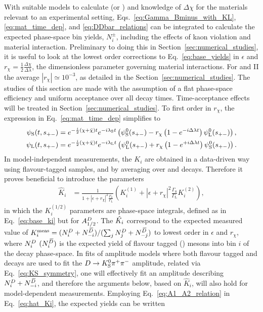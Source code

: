 With suitable models to calculate \ADorDbSL (or \ADorDbonetwo) and knowledge of $\Delta\chi$ for the materials relevant to an experimental setting, Eqs.~\eqref{eq:Gamma_Bminus_with_KL}, \eqref{eq:mat_time_dep}, and \eqref{eq:DDbar_relations} can be integrated to calculate the expected phase-space bin yields, $N^\pm_i$, including the effects of kaon \CP violation and material interaction. Preliminary to doing this in Section~\ref{sec:numerical_studies}, it is useful to look at the lowest order corrections to Eq.~\eqref{eq:base_yields} in $\epsilon$ and $r_\chi=\frac{1}{2}\frac{\Delta \chi}{\Delta \lambda}$, the dimensionless parameter governing material interactions. For \lhcb and \belle II the average $|r_\chi|\simeq10^{-3}$, as detailed in the Section~\ref{sec:numerical_studies}. The studies of this section are made with the assumption of a flat phase-space efficiency and uniform acceptance over all decay times. Time-acceptance effects will be treated in Section~\ref{sec:numerical_studies}. To first order in $r_\chi$, the expression in Eq.~\eqref{eq:mat_time_dep} simplifies to~\cite{Fetscher1996}
\begin{align}
\begin{split}
        \psi_\text{S}(t, s_{+-}) &= e^{-\frac{i}{2}(\chi + \bar \chi)t}e^{-i \lambda_{\rm S}t}\left( \psi^0_{\rm S}(s_{+-})
        -r_\chi\left(1-e^{-i\Delta\lambda t} \right)\psi^0_{\rm L}(s_{+-})\right), \\
    \psi_\text{L}(t, s_{+-}) &= e^{-\frac{i}{2}(\chi + \bar \chi)t}e^{-i \lambda_{\rm L}t}\left( \psi^0_{\rm L}(s_{+-})  
        +r_\chi\left(1-e^{+i\Delta\lambda t}\right)\psi^0_{\rm S}(s_{+-})\right).
\end{split}
\end{align}
 In model-independent measurements, the $K_i$ are obtained in a data-driven way using flavour-tagged \D samples, and by averaging over \Dz and \Dzb decays. Therefore it proves beneficial to introduce the parameters
\begin{align}\label{eq:hat_Ki}
\hat K_i &= \frac{1}{1+|\epsilon+r_\chi|^2\frac{\Gamma_\text{S}}{\Gamma_\text{L}}}\left(K_i^{(1)}+|\epsilon+r_\chi|^2\frac{\Gamma_\text{S}}{\Gamma_\text{L}}K_i^{(2)}\right),
\end{align}
in which the $K^{(1/2)}_i$ parameters are phase-space integrals, defined as in Eq.~\eqref{eq:base_ki} but for $A^{D}_{1/2}$. The $\hat {K_i}$ correspond to the expected measured value of $K_i^\text{meas}=({N^{D}_i + N^{\kern 0.18em\overline{\kern -0.18em D}}_{-i}})/({\sum_j N^{D}_j +N^{\kern 0.18em\overline{\kern -0.18em D}}_{-j}})$ to lowest order in $\epsilon$ and $r_\chi$, where $N^{D}_i$ $(N^{\kern 0.18em\overline{\kern -0.18em D}}_i)$ is the expected yield of flavour tagged \Dz (\Dzb) mesons into bin $i$ of the \D decay phase-space. In fits of amplitude models where both flavour tagged \Dz and \Dzb decays are used to fit the ${D}\rightarrow{\ensuremath{{K}^0_{\mathrm{S}}}}{\ensuremath{{\pi}^+}}{\ensuremath{{\pi}^-}}$ amplitude, related via Eq.~\eqref{eq:KS_symmetry}, one will effectively fit an amplitude describing $N^{D}_i+N^{\kern 0.18em\overline{\kern -0.18em D}}_{-i}$, and therefore the arguments below, based on $\hat K_i$, will also hold for model-dependent measurements. Employing Eq.~\eqref{eq:A1_A2_relation} in Eq.~\eqref{eq:hat_Ki}, the expected yields can be written
